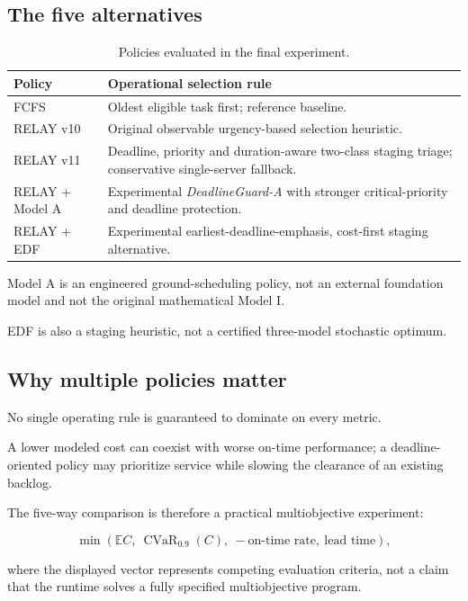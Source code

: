 \documentclass[10pt,a4paper]{article}
\DeclareMathOperator{\CVaR}{CVaR}
\newcommand{\EE}{\mathbb{E}}
\theoremstyle{plain}
\theoremstyle{definition}
\theoremstyle{remark}
\begin{document}
\subsection{The five alternatives}

\begin{table}[!htbp]
\centering
\caption{Policies evaluated in the final experiment.}
\label{tab:policies}
\small
\begin{tabularx}{\linewidth}{@{}p{30mm}L@{}}
\toprule
Policy & Operational selection rule \\
\midrule
FCFS &
Oldest eligible task first;
reference baseline. \\
RELAY v10 &
Original observable urgency-based
selection heuristic. \\
RELAY v11 &
Deadline, priority and duration-aware
two-class staging triage;
conservative single-server fallback. \\
RELAY + Model A &
Experimental \emph{DeadlineGuard-A}
with stronger critical-priority
and deadline protection. \\
RELAY + EDF &
Experimental earliest-deadline-emphasis,
cost-first staging alternative. \\
\bottomrule
\end{tabularx}
\end{table}

Model A is an engineered
ground-scheduling policy,
not an external foundation model
and not the original mathematical Model I.

EDF is also a staging heuristic,
not a certified
three-model stochastic optimum.

\subsection{Why multiple policies matter}

No single operating rule is
guaranteed to dominate on every metric.

A lower modeled cost can coexist with
worse on-time performance;
a deadline-oriented policy may prioritize
service while slowing the clearance
of an existing backlog.

The five-way comparison is therefore
a practical multiobjective experiment:

\[
\min
\left(
\EE C,\ 
\CVaR_{0.9}(C),\
-\text{on-time rate},\
\text{lead time}
\right),
\]

where the displayed vector
represents competing evaluation criteria,
not a claim that the runtime solves
a fully specified multiobjective program.
\end{document}
